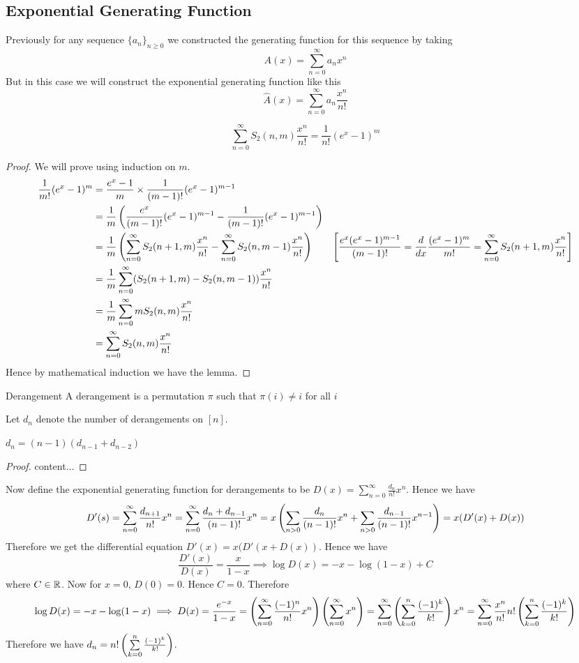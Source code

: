 \documentclass[twoside]{article}
\begin{document}
\subsection{Exponential Generating Function}
Previously for any sequence $\{a_n\}_{n\geq 0}$ we constructed the generating function for this sequence by taking $$A(x)=\sum_{n=0}^{\infty}a_nx^n$$But in this case we will construct the exponential generating function like this $$\hat{A}(x)=\sum_{n=0}^{\infty}a_n\frac{x^n}{n!}$$
\begin{lemma}{}{}
	$$\sum_{n=0}^{\infty}S_2(n,m)\frac{x^n}{n!}=\frac{1}{n!}(e^x-1)^m$$
\end{lemma}
\begin{proof}We will prove using induction on $m$.
	\begin{align*}
		\frac{1}{m!}(e^x-1)^m & = \frac{e^x-1}{m}\times \frac1{(m-1)!}(e^x-1)^{m-1}\\
		& = \frac1m\left(  \frac{e^x}{(m-1)!}(e^x-1)^{m-1}-\frac1{(m-1)!}(e^x-1)^{m-1}  \right)\\
		& = \frac1m\left( \sum_{n=0}^{\infty}S_2(n+1,m)\frac{x^n}{n!}-\sum_{n=0}^{\infty}S_2(n,m-1)\frac{x^n}{n!} \right)&\left[\frac{e^x(e^x-1)^{m-1}}{(m-1)!}=\frac{d}{dx}\frac{(e^x-1)^{m}}{m!}=\sum_{n=0}^{\infty} S_2(n+1,m)\frac{x^n}{n!} \right]\\
		& = \frac1m\sum_{n=0}^{\infty}(S_2(n+1,m)-S_2(n,m-1))\frac{x^n}{n!}\\
		&= \frac1m\sum_{n=0}^{\infty}mS_2(n,m)\frac{x^n}{n!}\\
		&= \sum_{n=0}^{\infty}S_2(n,m)\frac{x^n}{n!}
	\end{align*}Hence by mathematical induction we have the lemma.
\end{proof}
\begin{Definition}{Derangement}{}
	A derangement is a permutation $\pi$ such that $\pi(i)\neq i$ for all $i$
\end{Definition}
Let $d_n$ denote the number of derangements on $[n]$. 
\begin{lemma}{}{}
	$d_n=(n-1)(d_{n-1}+d_{n-2})$
\end{lemma}
\begin{proof}
	content...
\end{proof}

Now define the exponential generating function for derangements to be $D(x)=\sum\limits_{n=0}^{\infty}\frac{d_n}{n!}x^n$. Hence we have $$D'(s)=\sum_{n=0}^{\infty}\frac{d_{n+1}}{n!}x^n=\sum_{n=0}^{\infty}\frac{d_n+d_{n-1}}{(n-1)!}x^n=x\left(\sum_{n>0}\frac{d_n}{(n-1)!}x^n+\sum_{n>0}\frac{d_{n-1}}{(n-1)!}x^{n-1}    \right)=x(D'(x)+D(x))$$Therefore we get the differential equation  $D'(x)=x(D'(x+D(x))$. Hence we have $$\frac{D'(x)}{D(x)}=\frac{x}{1-x}\implies \log D(x)=-x-\log (1-x)+C$$where $C\in\mathbb{R}$. Now for $x=0$, $D(0)=0$. Hence $C=0$. Therefore $$\log D(x)=-x-\log(1-x)\implies D(x)=\frac{e^{-x}}{1-x}=\left(\sum_{n=0}^{\infty}\frac{(-1)^n}{n!}x^n\right)\left(\sum_{n=0}^{\infty}x^n\right)=\sum_{n=0}^{\infty}\left( \sum_{k=0}^n\frac{(-1)^k}{k!} \right)x^n=\sum_{n=0}^{\infty}\frac{x^n}{n!}n!\left( \sum_{k=0}^n\frac{(-1)^k}{k!} \right)$$Therefore we have $ d_n=n!\left( \sum\limits_{k=0}^n\frac{(-1)^k}{k!} \right)$.
\end{document}
